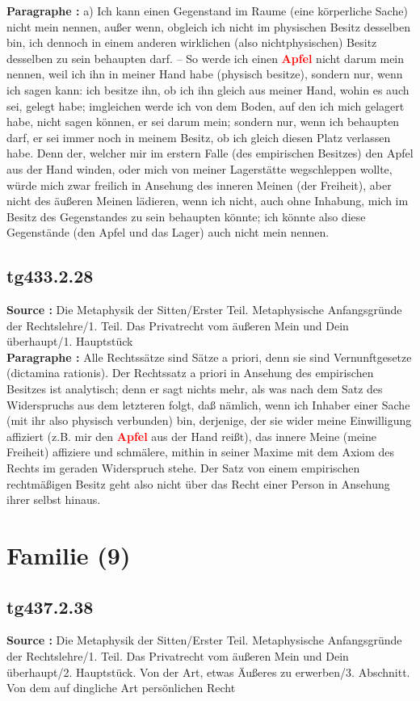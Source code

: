 \documentclass[a4paper,12pt,twoside]{book}
\newcommand{\match}[1]{\textcolor{red}{\textbf{#1}}}
\newcommand{\unnumberedsection}[1]{
	\section*{#1}
	\addcontentsline{toc}{section}{#1}
	\markright{#1}
}
\begin{document}
	\textbf{Paragraphe : }a) Ich kann einen Gegenstand im Raume (eine körperliche Sache) nicht mein nennen, außer wenn, obgleich ich nicht im physischen Besitz desselben bin, ich dennoch  in einem anderen wirklichen (also nichtphysischen) Besitz desselben zu sein behaupten darf. – So werde ich einen \match{Apfel} nicht darum mein nennen, weil ich ihn in meiner Hand habe (physisch besitze), sondern nur, wenn ich sagen kann: ich besitze ihn, ob ich ihn gleich aus meiner Hand, wohin es auch sei, gelegt habe; imgleichen werde ich von dem Boden, auf den ich mich gelagert habe, nicht sagen können, er sei darum mein; sondern nur, wenn ich behaupten darf, er sei immer noch in meinem Besitz, ob ich gleich diesen Platz verlassen habe. Denn der, welcher mir im erstern Falle (des empirischen Besitzes) den Apfel aus der Hand winden, oder mich von meiner Lagerstätte wegschleppen wollte, würde mich zwar freilich in Ansehung des inneren Meinen (der Freiheit), aber nicht des äußeren Meinen lädieren, wenn ich nicht, auch ohne Inhabung, mich im Besitz des Gegenstandes zu sein behaupten könnte; ich könnte also diese Gegenstände (den Apfel und das Lager) auch nicht mein nennen. 
	
	\subsection*{tg433.2.28} 
	\textbf{Source : }Die Metaphysik der Sitten/Erster Teil. Metaphysische Anfangsgründe der Rechtslehre/1. Teil. Das Privatrecht vom äußeren Mein und Dein überhaupt/1. Hauptstück\\  
	
	\textbf{Paragraphe : }Alle Rechtssätze sind Sätze a priori, denn sie sind Vernunftgesetze (dictamina rationis). Der Rechtssatz a priori in Ansehung des empirischen Besitzes ist analytisch; denn er sagt nichts mehr, als was nach dem Satz des Widerspruchs aus dem letzteren folgt, daß nämlich, wenn ich Inhaber einer Sache (mit ihr also physisch verbunden) bin, derjenige, der sie wider meine Einwilligung affiziert (z.B. mir den \match{Apfel} aus der Hand reißt), das innere Meine (meine Freiheit) affiziere und schmälere, mithin in seiner Maxime mit dem Axiom des Rechts im geraden Widerspruch stehe. Der Satz von einem empirischen rechtmäßigen Besitz geht also nicht über das Recht einer Person in Ansehung ihrer selbst hinaus. 
	
	\unnumberedsection{Familie (9)} 
	\subsection*{tg437.2.38} 
	\textbf{Source : }Die Metaphysik der Sitten/Erster Teil. Metaphysische Anfangsgründe der Rechtslehre/1. Teil. Das Privatrecht vom äußeren Mein und Dein überhaupt/2. Hauptstück. Von der Art, etwas Äußeres zu erwerben/3. Abschnitt. Von dem auf dingliche Art persönlichen Recht\\  
	
\end{document}
